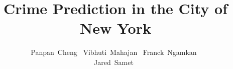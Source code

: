 \documentclass[10pt,journal,compsoc]{IEEEtran}
\begin{document}
%
\title{Crime Prediction in the City of New York}
%
%
%
%

\author{Panpan~Cheng~
        Vibhuti~Mahajan~
        Franck~Ngamkan~\\
        Jared~Samet~%
}

%
%
\end{document}
